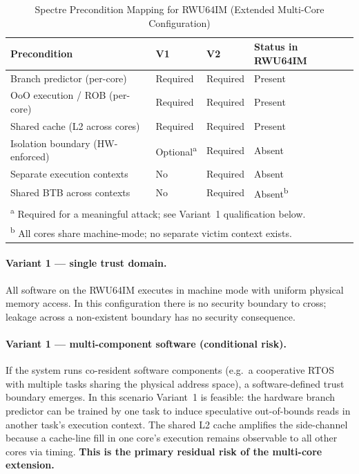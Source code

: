 \begin{table}[h]
\centering
\caption{Spectre Precondition Mapping for RWU64IM (Extended Multi-Core Configuration)}
\label{tab:spectre_precond}
\begin{tabular}{llll}
\hline
\textbf{Precondition} & \textbf{V1} & \textbf{V2} & \textbf{Status in RWU64IM} \\
\hline
Branch predictor (per-core)          & Required & Required & Present \\
OoO execution / ROB (per-core)       & Required & Required & Present \\
Shared cache (L2 across cores)       & Required & Required & Present \\
Isolation boundary (HW-enforced)     & Optional\textsuperscript{a} & Required & Absent \\
Separate execution contexts          & No       & Required & Absent \\
Shared BTB across contexts           & No       & Required & Absent\textsuperscript{b} \\
\hline
\multicolumn{4}{l}{\textsuperscript{a} Required for a meaningful attack; see Variant~1 qualification below.} \\
\multicolumn{4}{l}{\textsuperscript{b} All cores share machine-mode; no separate victim context exists.} \\
\end{tabular}
\end{table}

\paragraph{Variant 1 — single trust domain.}
All software on the RWU64IM executes in machine mode with uniform physical memory
access.  In this configuration there is no security boundary to cross; leakage
across a non-existent boundary has no security consequence.

\paragraph{Variant 1 — multi-component software (conditional risk).}
If the system runs co-resident software components (e.g.\ a cooperative \mbox{RTOS}
with multiple tasks sharing the physical address space), a software-defined trust
boundary emerges.  In this scenario Variant~1 is feasible: the hardware branch
predictor can be trained by one task to induce speculative out-of-bounds reads in
another task's execution context.  The shared \mbox{L2} cache amplifies the
side-channel because a cache-line fill in one core's execution remains observable to
all other cores via timing.  \textbf{This is the primary residual risk of the
multi-core extension.}


